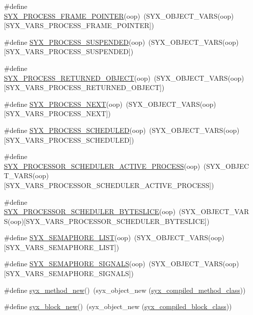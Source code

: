 \begin{CompactItemize}
\item 
\#define \hyperlink{syx-object_8h_c49eda7223af44f10a46c7be40bc3fac}{SYX\_\-PROCESS\_\-FRAME\_\-POINTER}(oop)~(SYX\_\-OBJECT\_\-VARS(oop)\mbox{[}SYX\_\-VARS\_\-PROCESS\_\-FRAME\_\-POINTER\mbox{]})
\item 
\#define \hyperlink{syx-object_8h_68958798ba77455939de869231f6eee1}{SYX\_\-PROCESS\_\-SUSPENDED}(oop)~(SYX\_\-OBJECT\_\-VARS(oop)\mbox{[}SYX\_\-VARS\_\-PROCESS\_\-SUSPENDED\mbox{]})
\item 
\#define \hyperlink{syx-object_8h_c6e63002ff510661d3f5c92177d9018e}{SYX\_\-PROCESS\_\-RETURNED\_\-OBJECT}(oop)~(SYX\_\-OBJECT\_\-VARS(oop)\mbox{[}SYX\_\-VARS\_\-PROCESS\_\-RETURNED\_\-OBJECT\mbox{]})
\item 
\#define \hyperlink{syx-object_8h_0a046ecb9b0607671ce20996d5e986fe}{SYX\_\-PROCESS\_\-NEXT}(oop)~(SYX\_\-OBJECT\_\-VARS(oop)\mbox{[}SYX\_\-VARS\_\-PROCESS\_\-NEXT\mbox{]})
\item 
\#define \hyperlink{syx-object_8h_99cbfe2ae15b516f6d3a60c06a8a3915}{SYX\_\-PROCESS\_\-SCHEDULED}(oop)~(SYX\_\-OBJECT\_\-VARS(oop)\mbox{[}SYX\_\-VARS\_\-PROCESS\_\-SCHEDULED\mbox{]})
\item 
\#define \hyperlink{syx-object_8h_e7a5e7b65675b5e2c49e4ea412119615}{SYX\_\-PROCESSOR\_\-SCHEDULER\_\-ACTIVE\_\-PROCESS}(oop)~(SYX\_\-OBJECT\_\-VARS(oop)\mbox{[}SYX\_\-VARS\_\-PROCESSOR\_\-SCHEDULER\_\-ACTIVE\_\-PROCESS\mbox{]})
\item 
\#define \hyperlink{syx-object_8h_f404b8c366724f2aee0d80cc416f4a61}{SYX\_\-PROCESSOR\_\-SCHEDULER\_\-BYTESLICE}(oop)~(SYX\_\-OBJECT\_\-VARS(oop)\mbox{[}SYX\_\-VARS\_\-PROCESSOR\_\-SCHEDULER\_\-BYTESLICE\mbox{]})
\item 
\#define \hyperlink{syx-object_8h_f602bbb62e7ca09615625e04b4f5610c}{SYX\_\-SEMAPHORE\_\-LIST}(oop)~(SYX\_\-OBJECT\_\-VARS(oop)\mbox{[}SYX\_\-VARS\_\-SEMAPHORE\_\-LIST\mbox{]})
\item 
\#define \hyperlink{syx-object_8h_7d7dca42d785621efdcdcd1c239d6013}{SYX\_\-SEMAPHORE\_\-SIGNALS}(oop)~(SYX\_\-OBJECT\_\-VARS(oop)\mbox{[}SYX\_\-VARS\_\-SEMAPHORE\_\-SIGNALS\mbox{]})
\item 
\#define \hyperlink{syx-object_8h_affde2fe16c24eeb141ee81ed91fe267}{syx\_\-method\_\-new}()~(syx\_\-object\_\-new (\hyperlink{syx-object_8h_e73b435f28f6326845c790d616f0763f}{syx\_\-compiled\_\-method\_\-class}))
\item 
\#define \hyperlink{syx-object_8h_eac6ccd66510e9bee47fc73dc7022e57}{syx\_\-block\_\-new}()~(syx\_\-object\_\-new (\hyperlink{syx-object_8h_6b5b733fa1150efc8b27835298b58087}{syx\_\-compiled\_\-block\_\-class}))
\end{CompactItemize}

